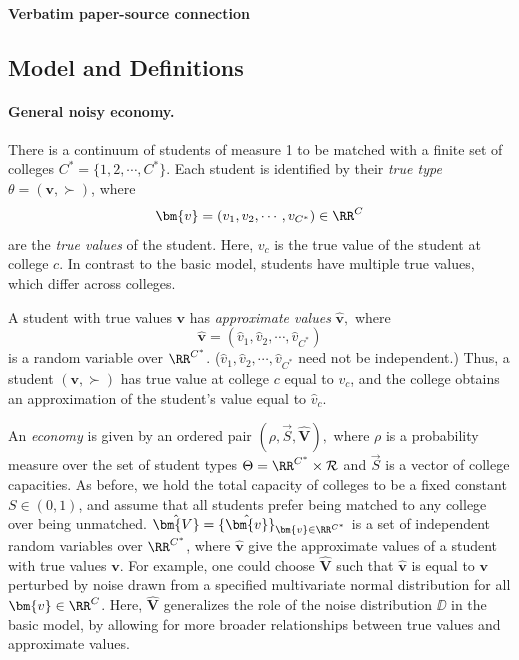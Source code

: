 \documentclass[10pt]{article}
\begin{document}
\paragraph{Verbatim paper-source connection}
\begin{ReviewVerbatim}
\subsection{Model and Definitions}

\paragraph{General noisy economy.}
There is a continuum of students of measure 1 to be matched with a finite set of colleges $C^* = \{1, 2, \cdots, C^*\}.$ Each student is identified by their \textit{true type} $\theta = (\bm{v}, \succ)$, where
\begin{equation}
    \bm{v} = (v_1, v_2, \cdots, v_{C^*}) \in \RR^C
\end{equation}
are the \textit{true values} of the student. Here, $v_c$ is the true value of the student at college $c$. In contrast to the basic model, students have multiple true values, which differ across colleges.

A student with true values $\bm{v}$ has \textit{approximate values} $\hat{\bm{v}},$ where
\begin{equation}
    \hat{\bm{v}} = (\hat{v}_1, \hat{v}_2, \cdots, \hat{v}_{C^*})
\end{equation}
is a random variable over $\RR^{C^*}$. ($\hat{v}_1, \hat{v}_2, \cdots, \hat{v}_{C^*}$ need not be independent.) Thus, a student $(\bm{v},\succ)$ has true value at college $c$ equal to $v_c$, and the college obtains an approximation of the student's value equal to $\hat{v}_c.$

An \textit{economy} is given by an ordered pair $(\rho, \vec{S}, \hat{\bm{V}}),$ where $\rho$ is a probability measure over the set of student types $\Theta = \RR^{C^*}\times \mathcal{R}$ and $\vec{S}$ is a vector of college capacities. As before, we hold the total capacity of colleges to be a fixed constant $S\in (0,1)$, and assume that all students prefer being matched to any college over being unmatched. $\hat{\bm{V}} = \{\hat{\bm{v}}\}_{\bm{v}\in \RR^{C^*}}$ is a set of independent random variables over $\RR^{C^*}$, where $\hat{\bm{v}}$ give the approximate values of a student with true values $\bm{v}$. For example, one could choose $\hat{\bm{V}}$ such that $\hat{\bm{v}}$ is equal to $\bm{v}$ perturbed by noise drawn from a specified multivariate normal distribution for all $\bm{v}\in \RR^C$. Here, $\hat{\bm{V}}$ generalizes the role of the noise distribution $\DD$ in the basic model, by allowing for more broader relationships between true values and approximate values.


\end{ReviewVerbatim}
\end{document}
